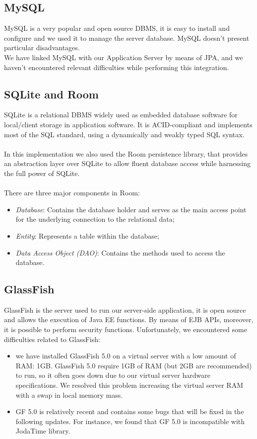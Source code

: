 \subsection{MySQL}
\label{subsec:Middleware}
MySQL is a very popular and open source DBMS, it is easy to install and configure and we used it to manage the server database. MySQL doesn't present particular disadvantages.\\
We have linked MySQL with our Application Server by means of JPA, and we haven't encountered relevant difficulties while performing this integration.

\subsection{SQLite and Room}
\label{subsec:SQLite and Room}
SQLite is a relational DBMS widely used as embedded database software for local/client storage in application software. It is ACID-compliant and implements most of the SQL standard, using a dynamically and weakly typed SQL syntax. \\\\
In this implementation we also used the Room persistence library, that provides an abstraction layer over SQLite to allow fluent database access while harnessing the full power of SQLite. \\\\
There are three major components in Room:
\begin{itemize}
\item \textit{Database}: Contains the database holder and serves as the main access point for the underlying connection to the relational data;
\item \textit{Entity}: Represents a table within the database;
\item \textit{Data Access Object (DAO)}: Contains the methods used to access the database.
\end{itemize}

\subsection{GlassFish}
\label{subsec:GlassFish}
GlassFish is the server used to run our server-side application, it is open source and allows the execution of Java EE functions. By means of EJB APIs, moreover, it is possible to perform security functions. Unfortunately, we encountered some difficulties related to GlassFish:
\begin{itemize}
\item we have installed GlassFish 5.0 on a virtual server with a low amount of RAM: 1GB. GlassFish 5.0 require 1GB of RAM (but 2GB are recommended) to run, so it often goes down due to our virtual server hardware specifications. We resolved this problem increasing the virtual server RAM with a swap in local memory mass.
\item GF 5.0 is relatively recent and contains some bugs that will be fixed in the following updates. For instance, we found that GF 5.0 is incompatible with JodaTime library.
\end{itemize}